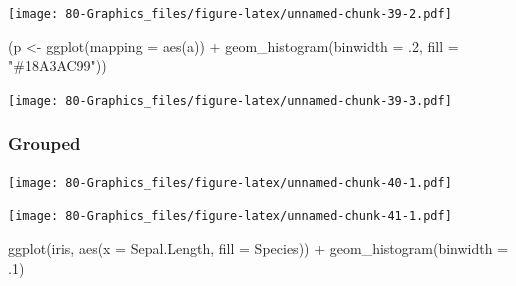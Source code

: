 \documentclass[
]{book}
\newenvironment{Shaded}{\begin{snugshade}}{\end{snugshade}}
\newcommand{\AttributeTok}[1]{\textcolor[rgb]{0.77,0.63,0.00}{#1}}
\newcommand{\DecValTok}[1]{\textcolor[rgb]{0.00,0.00,0.81}{#1}}
\newcommand{\FunctionTok}[1]{\textcolor[rgb]{0.00,0.00,0.00}{#1}}
\newcommand{\NormalTok}[1]{#1}
\newcommand{\OtherTok}[1]{\textcolor[rgb]{0.56,0.35,0.01}{#1}}
\newcommand{\SpecialCharTok}[1]{\textcolor[rgb]{0.00,0.00,0.00}{#1}}
\newcommand{\StringTok}[1]{\textcolor[rgb]{0.31,0.60,0.02}{#1}}
\begin{document}
\texttt{[image: 80-Graphics\_files/figure-latex/unnamed-chunk-39-2.pdf]}

\begin{Shaded}
\begin{Highlighting}[]
\NormalTok{(p }\OtherTok{\textless{}{-}} \FunctionTok{ggplot}\NormalTok{(}\AttributeTok{mapping =} \FunctionTok{aes}\NormalTok{(a)) }\SpecialCharTok{+}
    \FunctionTok{geom\_histogram}\NormalTok{(}\AttributeTok{binwidth =}\NormalTok{ .}\DecValTok{2}\NormalTok{, }\AttributeTok{fill =} \StringTok{"\#18A3AC99"}\NormalTok{))}
\end{Highlighting}
\end{Shaded}

\texttt{[image: 80-Graphics\_files/figure-latex/unnamed-chunk-39-3.pdf]}

\hypertarget{grouped-2}{%
\subsubsection{Grouped}\label{grouped-2}}

\begin{Shaded}
\end{Shaded}

\texttt{[image: 80-Graphics\_files/figure-latex/unnamed-chunk-40-1.pdf]}

\begin{Shaded}
\end{Shaded}

\texttt{[image: 80-Graphics\_files/figure-latex/unnamed-chunk-41-1.pdf]}

\begin{Shaded}
\begin{Highlighting}[]
\FunctionTok{ggplot}\NormalTok{(iris, }\FunctionTok{aes}\NormalTok{(}\AttributeTok{x =}\NormalTok{ Sepal.Length, }\AttributeTok{fill =}\NormalTok{ Species)) }\SpecialCharTok{+} 
  \FunctionTok{geom\_histogram}\NormalTok{(}\AttributeTok{binwidth =}\NormalTok{ .}\DecValTok{1}\NormalTok{)}
\end{Highlighting}
\end{Shaded}
\end{document}
